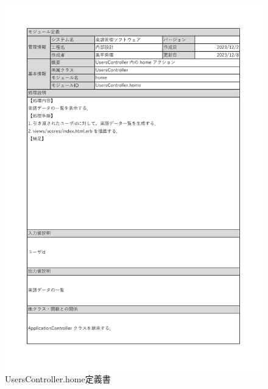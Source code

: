 \begin{figure}
    \centering
    \includegraphics[scale=0.7]{img/Users/xlsx/UsersController_home.pdf}
    \vspace{-1cm}
    \caption{UsersController.home定義書}
\end{figure}
